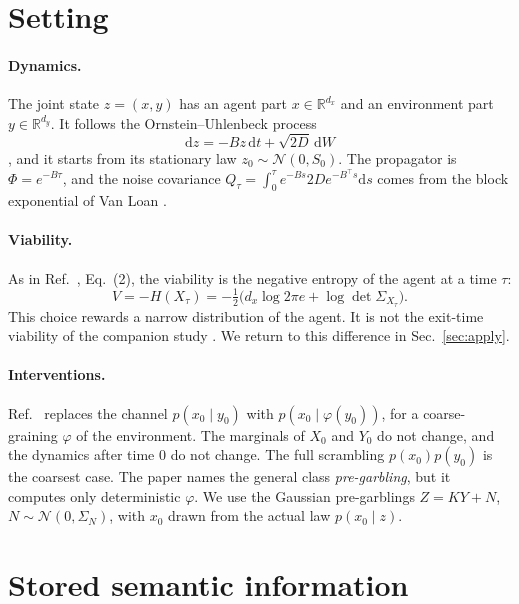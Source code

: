 \documentclass[11pt]{article}
\begin{document}
\section{Setting}
\label{sec:setting}
\paragraph{Dynamics.} The joint state $z=(x,y)$ has an agent part $x\in\mathbb{R}^{d_x}$ and an environment part
$y\in\mathbb{R}^{d_y}$. It follows the Ornstein--Uhlenbeck process
\begin{equation}
  \mathrm{d}z = -Bz\,\mathrm{d}t + \sqrt{2D}\,\mathrm{d}W
\end{equation}
\cite{Gardiner04}, and it starts from its stationary law $z_0\sim\mathcal{N}(0,S_0)$. The propagator is
$\Phi=e^{-B\tau}$, and the noise covariance $Q_\tau=\int_0^\tau e^{-Bs}2De^{-B^\top s}\mathrm{d}s$ comes from the block
exponential of Van Loan \cite{VanLoan78}.

\paragraph{Viability.} As in Ref.~\cite{KolchinskyWolpert18}, Eq.~(2), the viability is the negative entropy of the agent
at a time $\tau$:
\begin{equation}
  V = -H(X_\tau) = -\tfrac12\bigl(d_x\log 2\pi e + \log\det\Sigma_{X_\tau}\bigr).
\end{equation}
This choice rewards a narrow distribution of the agent. It is not the exit-time viability of the companion study
\cite{Beiro26}. We return to this difference in Sec.~\ref{sec:apply}.

\paragraph{Interventions.} Ref.~\cite{KolchinskyWolpert18} replaces the channel $p(x_0\mid y_0)$ with
$p(x_0\mid\varphi(y_0))$, for a coarse-graining $\varphi$ of the environment. The marginals of $X_0$ and $Y_0$ do not
change, and the dynamics after time 0 do not change. The full scrambling $p(x_0)p(y_0)$ is the coarsest case. The
paper names the general class \emph{pre-garbling}, but it computes only deterministic $\varphi$. We use the Gaussian
pre-garblings $Z=KY+N$, $N\sim\mathcal{N}(0,\Sigma_N)$, with $x_0$ drawn from the actual law $p(x_0\mid z)$.

\section{Stored semantic information}
\label{sec:static}
\end{document}
